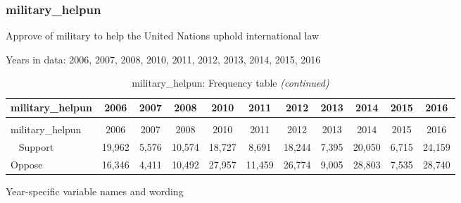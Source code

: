 \documentclass[12pt]{article}
\begin{document}
\subsubsection{military\_helpun}\label{military_helpun}

Approve of military to help the United Nations uphold international law

Years in data: 2006, 2007, 2008, 2010, 2011, 2012, 2013, 2014, 2015,
2016

\begin{longtable}[t]{lcccccccccc}
\caption{\label{tab:unnamed-chunk-4}military\_helpun: Frequency table}\\
\toprule
military\_helpun & 2006 & 2007 & 2008 & 2010 & 2011 & 2012 & 2013 & 2014 & 2015 & 2016\\
\midrule
\endfirsthead
\caption[]{military\_helpun: Frequency table \textit{(continued)}}\\
\toprule
military\_helpun & 2006 & 2007 & 2008 & 2010 & 2011 & 2012 & 2013 & 2014 & 2015 & 2016\\
\midrule
\endhead
\
\endfoot
\bottomrule
\endlastfoot
Support & 19,962 & 5,576 & 10,574 & 18,727 & 8,691 & 18,244 & 7,395 & 20,050 & 6,715 & 24,159\\
Oppose & 16,346 & 4,411 & 10,492 & 27,957 & 11,459 & 26,774 & 9,005 & 28,803 & 7,535 & 28,740\\*
\end{longtable}

Year-specific variable names and wording
\end{document}

